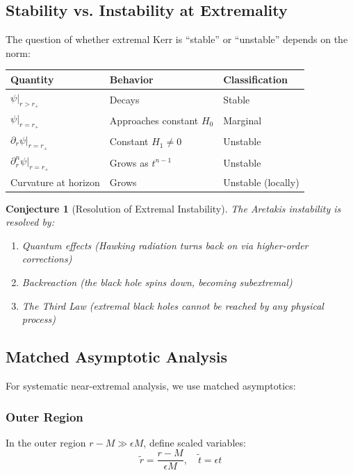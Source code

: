 \documentclass[12pt,a4paper]{article}
\newtheorem{conjecture}[theorem]{Conjecture}
\begin{document}
\subsection{Stability vs. Instability at Extremality}

The question of whether extremal Kerr is ``stable'' or ``unstable'' depends on the norm:

\begin{center}
\begin{tabular}{@{}lll@{}}
\toprule
\textbf{Quantity} & \textbf{Behavior} & \textbf{Classification} \\
\midrule
$\psi|_{r > r_+}$ & Decays & Stable \\
$\psi|_{r = r_+}$ & Approaches constant $H_0$ & Marginal \\
$\partial_r\psi|_{r = r_+}$ & Constant $H_1 \neq 0$ & Unstable \\
$\partial_r^n\psi|_{r = r_+}$ & Grows as $t^{n-1}$ & Unstable \\
Curvature at horizon & Grows & Unstable (locally) \\
\bottomrule
\end{tabular}
\end{center}

\begin{conjecture}[Resolution of Extremal Instability]
The Aretakis instability is resolved by:
\begin{enumerate}
    \item Quantum effects (Hawking radiation turns back on via higher-order corrections)
    \item Backreaction (the black hole spins down, becoming subextremal)
    \item The Third Law (extremal black holes cannot be reached by any physical process)
\end{enumerate}
\end{conjecture}

\subsection{Matched Asymptotic Analysis}

For systematic near-extremal analysis, we use matched asymptotics:

\subsubsection{Outer Region}

In the outer region $r - M \gg \epsilon M$, define scaled variables:
\begin{equation}
\tilde{r} = \frac{r - M}{\epsilon M}, \quad \tilde{t} = \epsilon t
\end{equation}
\end{document}
